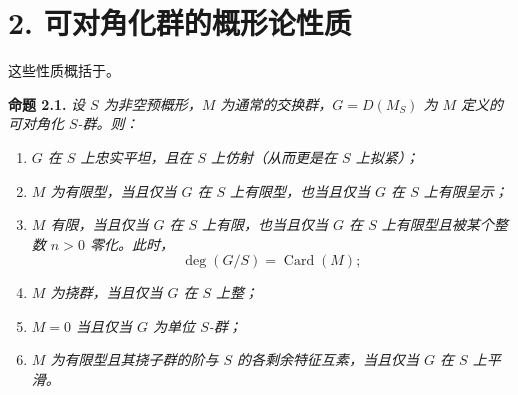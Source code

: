 %

\setcounter{footnote}{10}

\section*{2. 可对角化群的概形论性质}

这些性质概括于。

\medskip
\noindent{}\textbf{命题 2.1.}
\textit{设 \(S\) 为非空预概形，\(M\) 为通常的交换群，\(G=D(M_S)\) 为 \(M\) 定义的可对角化 \(S\)-群。则：}
\begin{enumerate}
  \item[(a)]
  \textit{\(G\) 在 \(S\) 上忠实平坦，且在 \(S\) 上仿射（从而更是在 \(S\) 上拟紧）；}

  \item[(b)]
  \textit{\(M\) 为有限型，当且仅当 \(G\) 在 \(S\) 上有限型，也当且仅当 \(G\) 在 \(S\) 上有限呈示；}

  \item[(c)]
  \textit{\(M\) 有限，当且仅当 \(G\) 在 \(S\) 上有限，也当且仅当 \(G\) 在 \(S\) 上有限型且被某个整数 \(n>0\) 零化。此时，}
  \[
    \deg(G/S)=\operatorname{Card}(M);
  \]

  \item[\((c')\)]
  \textit{\(M\) 为挠群，当且仅当 \(G\) 在 \(S\) 上整；}

  \item[(d)]
  \textit{\(M=0\) 当且仅当 \(G\) 为单位 \(S\)-群；}

  \item[(e)]
  \textit{\(M\) 为有限型且其挠子群的阶与 \(S\) 的各剩余特征互素，当且仅当 \(G\) 在 \(S\) 上平滑。}
\end{enumerate}

